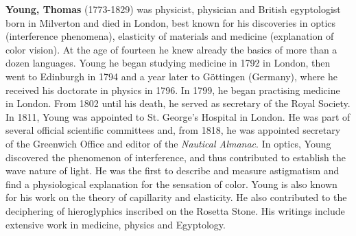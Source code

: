 \textbf{Young, Thomas} (1773-1829) was physicist, physician and British egyptologist born in Milverton and died in London, best known for his discoveries in optics (interference phenomena), elasticity of materials and medicine (explanation of color vision). At the age of fourteen he knew already the basics of more than a dozen languages. Young he began studying medicine in 1792 in London, then went to Edinburgh in 1794 and a year later to Göttingen (Germany), where he received his doctorate in physics in 1796. In 1799, he began practising medicine in London. From 1802 until his death, he served as secretary of the Royal Society. In 1811, Young was appointed to St. George's Hospital in London. He was part of several official scientific committees and, from 1818, he was appointed secretary of the Greenwich Office and editor of the \textit{Nautical Almanac}. In optics, Young discovered the phenomenon of interference, and thus contributed to establish the wave nature of light. He was the first to describe and measure astigmatism and find a physiological explanation for the sensation of color. Young is also known for his work on the theory of capillarity and elasticity. He also contributed to the deciphering of hieroglyphics inscribed on the Rosetta Stone. His writings include extensive work in medicine, physics and Egyptology.

